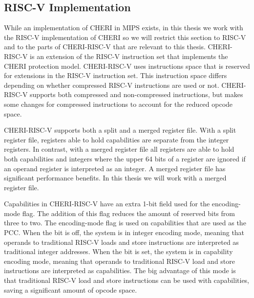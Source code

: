 \subsection{RISC-V Implementation}
\label{sec:cheri-risc-v}
While an implementation of CHERI in MIPS exists, in this thesis we work with the RISC-V implementation of CHERI so we will restrict this section to RISC-V and to the parts of CHERI-RISC-V that are relevant to this thesis. CHERI-RISC-V is an extension of the RISC-V instruction set that implements the CHERI protection model. CHERI-RISC-V uses instructions space that is reserved for extensions in the RISC-V instruction set. This instruction space differs depending on whether compressed RISC-V instructions are used or not. CHERI-RISC-V supports both compressed and non-compressed instructions, but makes some changes for compressed instructions to account for the reduced opcode space.

CHERI-RISC-V supports both a split and a merged register file. With a split register file, registers able to hold capabilities are separate from the integer registers. In contrast, with a merged register file all registers are able to hold both capabilities and integers where the upper 64 bits of a register are ignored if an operand register is interpreted as an integer. A merged register file has significant performance benefits. In this thesis we will work with a merged register file.

Capabilities in CHERI-RISC-V have an extra 1-bit field used for the encoding-mode flag. The addition of this flag reduces the amount of reserved bits from three to two. The encoding-mode flag is used on capabilities that are used as the PCC. When the bit is off, the system is in integer encoding mode, meaning that operands to traditional RISC-V loads and store instructions are interpreted as traditional integer addresses. When the bit is set, the system is in capability encoding mode, meaning that operands to traditional RISC-V load and store instructions are interpreted as capabilities. The big advantage of this mode is that traditional RISC-V load and store instructions can be used with capabilities, saving a significant amount of opcode space.
